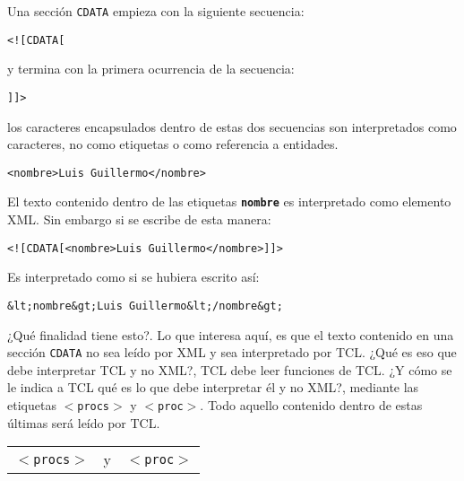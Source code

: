 \documentclass[10pt, a4paper, twocolumn]{article}
\begin{document}
Una sección \texttt{CDATA} empieza con la siguiente secuencia:

\begin{flushleft}
\begin{verbatim}
<![CDATA[
\end{verbatim}
\end{flushleft}

y termina con la primera ocurrencia de la secuencia:

\begin{flushleft}
\begin{verbatim}
]]>
\end{verbatim}
\end{flushleft}

los caracteres encapsulados dentro de estas dos secuencias son interpretados como caracteres, no como etiquetas o como referencia a entidades.

\lstset{language=XML} 
\begin{lstlisting}
<nombre>Luis Guillermo</nombre>
\end{lstlisting}

El texto contenido dentro de las etiquetas \textbf{\texttt{nombre}} es interpretado como elemento XML. Sin embargo si se escribe de esta manera:


\begin{verbatim}
<![CDATA[<nombre>Luis Guillermo</nombre>]]>
\end{verbatim}

Es interpretado como si se hubiera escrito así:

\begin{verbatim}
&lt;nombre&gt;Luis Guillermo&lt;/nombre&gt;
\end{verbatim}

¿Qué finalidad tiene esto?. Lo que interesa aquí, es que el texto contenido en una sección \texttt{CDATA} no sea leído por XML y sea interpretado por TCL. ¿Qué es eso que debe interpretar TCL y no XML?, TCL debe leer funciones de TCL. ¿Y cómo se le indica a TCL qué es lo que debe interpretar él y no XML?, mediante las etiquetas \texttt{$<$procs$>$} y \texttt{$<$proc$>$}. Todo aquello contenido dentro de estas últimas será leído por TCL.

\vspace{0.20cm}
\begin{center}
	\begin{tabular}{rcl}
		\texttt{$<$procs$>$} &y&\texttt{$<$proc$>$}\\
	\end{tabular}
\end{center}
\vspace{0.20cm}
\end{document}
